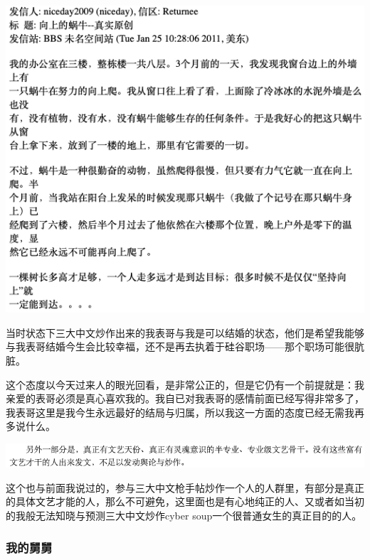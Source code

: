 \documentclass[9pt, b5paper]{article}
\begin{document}
\begin{center}
\includegraphics[width=.9\linewidth]{./pic/readme_20210520_095054.png}
\end{center}

当时状态下三大中文炒作出来的我表哥与我是可以结婚的状态，他们是希望我能够与我表哥结婚今生会比较幸福，还不是再去执着于硅谷职场——那个职场可能很肮脏。

这个态度以今天过来人的眼光回看，是非常公正的，但是它仍有一个前提就是：我亲爱的表哥必须是真心喜欢我的。我自已对我表哥的感情前面已经写得非常多了，我表哥这里是我今生永远最好的结局与归属，所以我这一方面的态度已经无需我再多说什么。

\begin{center}
\includegraphics[width=.9\linewidth]{./pic/readme_20210528_225603.png}
\end{center}

这个也与前面我说过的，参与三大中文枪手帖炒作一个人的人群里，有部分是真正的具体文艺才能的人，那么不可避免，这里面也是有心地纯正的人、又或者如当初的我般无法知晓与预测三大中文炒作cyber soup一个很普通女生的真正目的的人。 

\subsubsection{我的舅舅}
\label{sec:org9a41f19}
\end{document}
